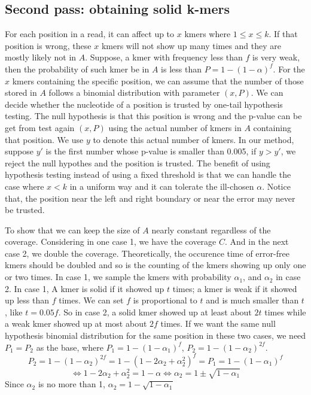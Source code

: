 \documentclass[10pt]{article}
\begin{document}

\subsection*{Second pass: obtaining solid k-mers}

For each position in a read, it can affect up to $x$ kmers where $1\le x\le k$. If that position is wrong, these $x$ kmers will not show up many times and they are mostly likely not in $A$. Suppose, a kmer with frequency less than $f$ is very weak, then the probability of such kmer be in $A$ is less than $P=1-(1-\alpha)^f$. For the $x$ kmers containing the specific position, we can assume that the number of those stored in $A$ follows a binomial distribution with parameter $(x,P)$. We can decide whether the nucleotide of a position is trusted by one-tail hypothesis testing. The null hypothesis is that this position is wrong and the p-value can be get from test again $(x,P)$ using the actual number of kmers in $A$ containing that position. We use $y$ to denote this actual number of kmers. In our method, suppose $y'$ is the first number whose p-value is smaller than 0.005, if $y>y'$, we reject the null hypothes and the position is trusted. The benefit of using hypothesis testing instead of using a fixed threshold is that we can handle the case where $x<k$ in a uniform way and it can tolerate the ill-chosen $\alpha$. Notice that, the position near the left and right boundary or near the error may never be trusted.

To show that we can keep the size of $A$ nearly constant regardless of the coverage. Considering in one case 1, we have the coverage $C$. And in the next case 2, we double the coverage. Theoretically, the occurence time of error-free kmers should be doubled and so is the counting of the kmers showing up only one or two times. In case 1, we sample the kmers with probability $\alpha_1$, and $\alpha_2$ in case 2. In case 1, A kmer is solid if it showed up $t$ times; a kmer is weak if it showed up less than $f$ times. We can set $f$ is proportional to $t$ and is much smaller than $t$, like $t=0.05f$. So in case 2, a solid kmer showed up at least about $2t$ times while a weak kmer showed up at most about $2f$ times. If we want the same null hypothesis binomial distribution for the same position in these two cases, we need $P_1=P_2$ as the base, where $P_1=1-(1-\alpha_1)^f$, $P_2=1-(1-\alpha_2)^{2f}$.
$$P_2=1-(1-\alpha_2)^{2f}=1-(1-2\alpha_2+\alpha_2^2)^f=P_1=1-(1-\alpha_1)^f$$
$$\Leftrightarrow 1-2\alpha_2+\alpha_2^2=1-\alpha \Leftrightarrow \alpha_2=1 \pm \sqrt{1-\alpha_1}$$
Since $\alpha_2$ is no more than 1, $\alpha_2=1-\sqrt{1-\alpha_1}$
\end{document}
